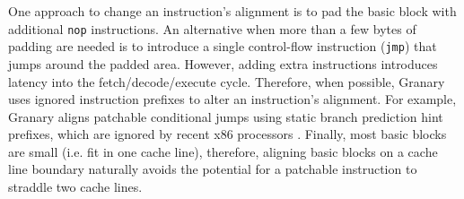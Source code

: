 \documentclass[preprint]{sigplanconf}
\begin{document}

One approach to change an instruction's alignment is to pad the basic block with additional \texttt{nop} instructions. An alternative when more than a few bytes of padding are needed is to introduce a single control-flow instruction (\texttt{jmp}) that jumps around the padded area. However, adding extra instructions introduces latency into the fetch/decode/execute cycle. Therefore, when possible, Granary uses ignored instruction prefixes to alter an instruction's alignment. For example, Granary aligns patchable conditional jumps using static branch prediction hint prefixes, which are ignored by recent x86 processors \cite{AgnerMicroarchitecture}. Finally, most basic blocks are small (i.e. fit in one cache line), therefore, aligning basic blocks on a cache line boundary naturally avoids the potential for a patchable instruction to straddle two cache lines.






\end{document}
